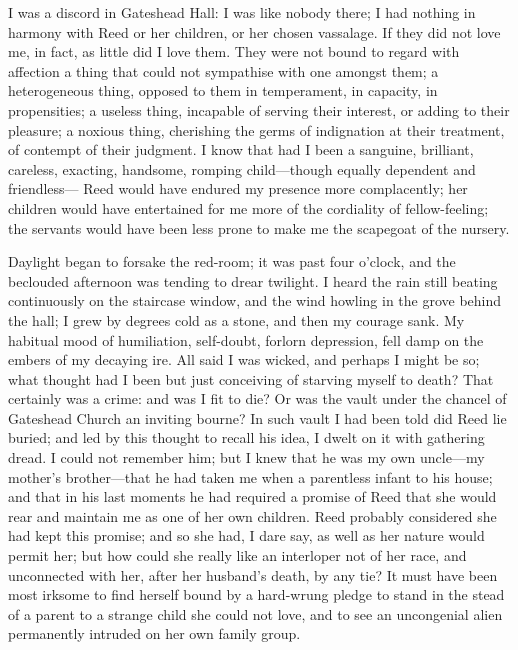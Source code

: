 I was a discord in Gateshead Hall: I was like nobody there; I had
nothing in harmony with \Mrs{} Reed or her children, or her chosen
vassalage.  If they did not love me, in fact, as little did I love
them.  They were not bound to regard with affection a thing that could
not sympathise with one amongst them; a heterogeneous thing, opposed to
them in temperament, in capacity, in propensities; a useless thing,
incapable of serving their interest, or adding to their pleasure; a
noxious thing, cherishing the germs of indignation at their treatment,
of contempt of their judgment.  I know that had I been a sanguine,
brilliant, careless, exacting, handsome, romping child---though equally
dependent and friendless---\Mrs{} Reed would have endured my presence more
complacently; her children would have entertained for me more of the
cordiality of fellow-feeling; the servants would have been less prone to
make me the scapegoat of the nursery.

Daylight began to forsake the red-room; it was past four o'clock, and
the beclouded afternoon was tending to drear twilight.  I heard the rain
still beating continuously on the staircase window, and the wind howling
in the grove behind the hall; I grew by degrees cold as a stone, and
then my courage sank.  My habitual mood of humiliation, self-doubt,
forlorn depression, fell damp on the embers of my decaying ire.  All
said I was wicked, and perhaps I might be so; what thought had I been
but just conceiving of starving myself to death?  That certainly was a
crime: and was I fit to die?  Or was the vault under the chancel of
Gateshead Church an inviting bourne?  In such vault I had been told did
\Mr{} Reed lie buried; and led by this thought to recall his idea, I dwelt
on it with gathering dread.  I could not remember him; but I knew that
he was my own uncle---my mother's brother---that he had taken me when a
parentless infant to his house; and that in his last moments he had
required a promise of \Mrs{} Reed that she would rear and maintain me as
one of her own children.  \Mrs{} Reed probably considered she had kept
this promise; and so she had, I dare say, as well as her nature would
permit her; but how could she really like an interloper not of her race,
and unconnected with her, after her husband's death, by any tie?  It
must have been most irksome to find herself bound by a hard-wrung pledge
to stand in the stead of a parent to a strange child she could not love,
and to see an uncongenial alien permanently intruded on her own family
group.

